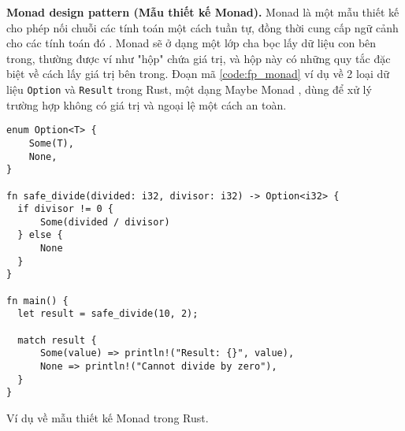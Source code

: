 
\textbf{Monad design pattern (Mẫu thiết kế Monad).} Monad là một mẫu thiết kế cho phép nối chuỗi các tính toán một cách tuần tự, đồng thời cung cấp ngữ cảnh cho các tính toán đó \cite{gill2015remote}.
Monad sẽ ở dạng một lớp cha bọc lấy dữ liệu con bên trong, thường được ví như "hộp" chứa giá trị, và hộp này có những quy tắc đặc biệt về cách lấy giá trị bên trong.
Đoạn mã \ref{code:fp_monad} ví dụ về 2 loại dữ liệu \texttt{Option} và \texttt{Result} trong Rust, một dạng Maybe Monad \cite{wikibooksHaskellUnderstandingMonadsMaybe}, dùng để xử lý trường hợp không có giá trị và ngoại lệ một cách an toàn.

\begin{listing}[H]
\begin{verbatim}
enum Option<T> {
    Some(T),
    None,
}

fn safe_divide(divided: i32, divisor: i32) -> Option<i32> {
  if divisor != 0 {
      Some(divided / divisor)
  } else {
      None
  }
}

fn main() {
  let result = safe_divide(10, 2);

  match result {
      Some(value) => println!("Result: {}", value),
      None => println!("Cannot divide by zero"),
  }
}
\end{verbatim}
\caption{Ví dụ về mẫu thiết kế Monad trong Rust.}
\label{code:fp_monad}
\end{listing}



